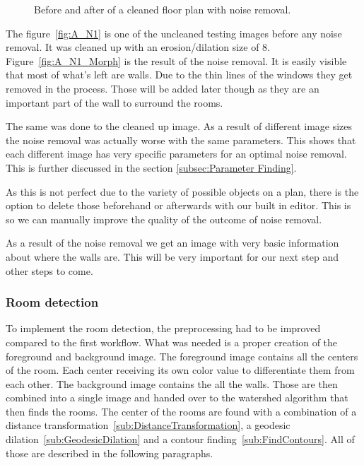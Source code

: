 \begin{figure}[h]
	\centering
	\hfill
	\caption{Before and after of a cleaned floor plan with noise removal.}
\end{figure}

The figure~\ref{fig:A_N1} is one of the uncleaned testing images before any noise removal. It was cleaned up with an erosion/dilation size of 8. Figure~\ref{fig:A_N1_Morph} is the result of the noise removal. It is easily visible that most of what's left are walls. Due to the thin lines of the windows they get removed in the process. Those will be added later though as they are an important part of the wall to surround the rooms.

The same was done to the cleaned up image. As a result of different image sizes the noise removal was actually worse with the same parameters. This shows that each different image has very specific parameters for an optimal noise removal. This is further discussed in the section \ref{subsec:Parameter Finding}.

As this is not perfect due to the variety of possible objects on a plan, there is the option to delete those beforehand or afterwards with our built in editor. This is so we can manually improve the quality of the outcome of noise removal.

As a result of the noise removal we get an image with very basic information about where the walls are. This will be very important for our next step and other steps to come.


\subsubsection{Room detection}
To implement the room detection, the preprocessing had to be improved compared to the first workflow. What was needed is a proper creation of the foreground and background image. The foreground image contains all the centers of the room. Each center receiving its own color value to differentiate them from each other. The background image contains the all the walls. Those are then combined into a single image and handed over to the watershed algorithm that then finds the rooms. The center of the rooms are found with a combination of a distance transformation~\ref{sub:DistanceTransformation}, a geodesic dilation~\ref{sub:GeodesicDilation} and a contour finding~\ref{sub:FindContours}. All of those are described in the following paragraphs.

